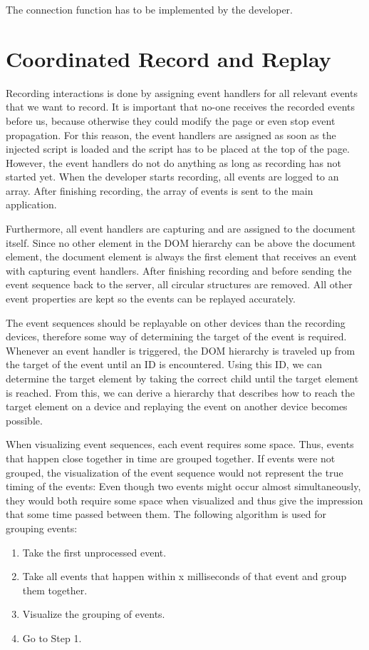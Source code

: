 The connection function has to be implemented by the developer.

\section{Coordinated Record and Replay}

Recording interactions is done by assigning event handlers for all relevant events that we want to record. It is important that no-one receives the recorded events before us, because otherwise they could modify the page or even stop event propagation. For this reason, the event handlers are assigned as soon as the injected script is loaded and the script has to be placed at the top of the page. However, the event handlers do not do anything as long as recording has not started yet. When the developer starts recording, all events are logged to an array. After finishing recording, the array of events is sent to the main application. 

Furthermore, all event handlers are capturing and are assigned to the document itself. Since no other element in the DOM hierarchy can be above the document element, the document element is always the first element that receives an event with capturing event handlers. After finishing recording and before sending the event sequence back to the server, all circular structures are removed. All other event properties are kept so the events can be replayed accurately.

The event sequences should be replayable on other devices than the recording devices, therefore some way of determining the target of the event is required. Whenever an event handler is triggered, the DOM hierarchy is traveled up from the target of the event until an ID is encountered. Using this ID, we can determine the target element by taking the correct child until the target element is reached. From this, we can derive a hierarchy that describes how to reach the target element on a device and replaying the event on another device becomes possible.

When visualizing event sequences, each event requires some space. Thus, events that happen close together in time are grouped together. If events were not grouped, the visualization of the event sequence would not represent the true timing of the events: Even though two events might occur almost simultaneously, they would both require some space when visualized and thus give the impression that some time passed between them. The following algorithm is used for grouping events:
\begin{enumerate}
	\item Take the first unprocessed event.
	\item Take all events that happen within x milliseconds of that event and group them together.
	\item Visualize the grouping of events.
	\item Go to Step 1.
\end{enumerate}

